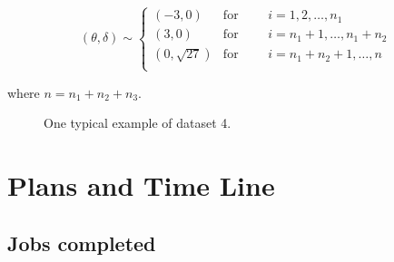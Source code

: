 \documentclass[12]{report}
\begin{document}
\[ (\theta, \delta) \sim \left\{ \begin{array}{ll}
         (-3, 0) & \mbox{for $\qquad i = 1,2, \dots, n_1$}\\
        	(3, 0) & \mbox{for  $\qquad i = n_1 + 1, \dots, n_1 + n_2$}\\
        	(0, \sqrt{27}) & \mbox{for  $\qquad i = n_1 + n_2 + 1, \dots, n$}\\
        \end{array} \right. \]
        
        
        where $n = n_1 + n_2 + n_3.$
        
 \begin{figure}[ht]
   \centering
       \caption{One typical example of dataset 4.}
       \label{data4}
\end{figure}   



\section{Plans and Time Line}

\subsection{Jobs completed}
\end{document}
